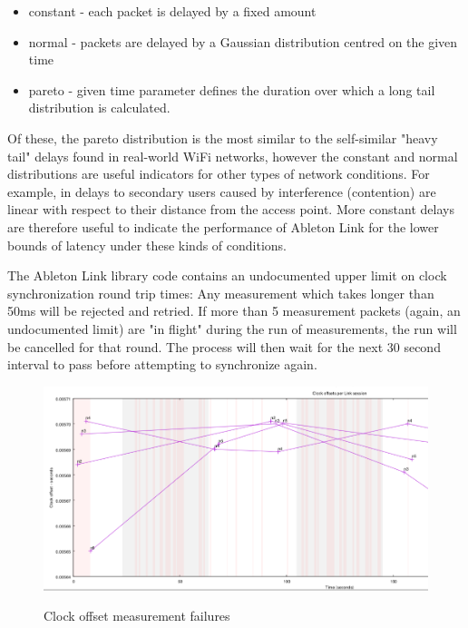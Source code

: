 \documentclass[11pt]{article} %
\theoremstyle{plain}
\theoremstyle{definition}
\begin{document}
\begin{itemize}
  \item constant - each packet is delayed by a fixed amount
  \item normal - packets are delayed by a Gaussian distribution centred on the given time
  \item pareto - given time parameter defines the duration over which a long tail distribution is calculated.
\end{itemize}

Of these, the pareto distribution is the most similar to the self-similar
"heavy tail" delays found in real-world WiFi
networks\cite{bletsas2005evaluation}\cite{zhang2008delay}, however the constant
and normal distributions are useful indicators for other types of network
conditions. For example, in \cite{wang2014improving} delays to secondary users
caused by interference (contention) are linear with respect to their distance
from the access point.  More constant delays are therefore useful to indicate
the performance of Ableton Link for the lower bounds of latency under these
kinds of conditions.

The Ableton Link library code contains an undocumented upper limit on clock
synchronization round trip times: Any measurement which takes longer than 50ms
will be rejected and retried. If more than 5 measurement packets (again, an
undocumented limit) are "in flight" during the run of measurements, the run
will be cancelled for that round. The process will then wait for the next 30
second interval to pass before attempting to synchronize again.


\begin{figure}
  \caption{Clock offset measurement failures}
  \includegraphics[width=1\textwidth]{figures-for-publication/offset-measurement-failures.png}
  \label{fig:offset-measurements-missed}
\end{figure}
\end{document}
